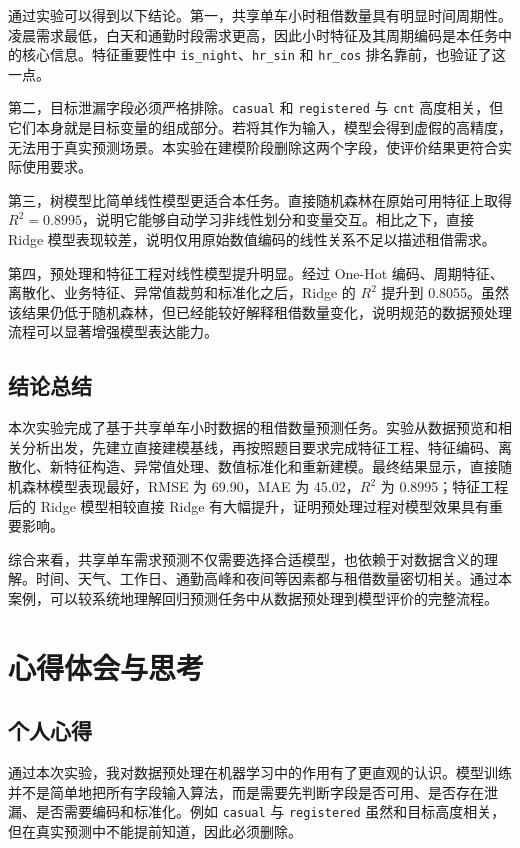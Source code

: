 \documentclass[UTF8,a4paper,12pt]{ctexart}
\begin{document}
通过实验可以得到以下结论。第一，共享单车小时租借数量具有明显时间周期性。凌晨需求最低，白天和通勤时段需求更高，因此小时特征及其周期编码是本任务中的核心信息。特征重要性中 \texttt{is\_night}、\texttt{hr\_sin} 和 \texttt{hr\_cos} 排名靠前，也验证了这一点。

第二，目标泄漏字段必须严格排除。\texttt{casual} 和 \texttt{registered} 与 \texttt{cnt} 高度相关，但它们本身就是目标变量的组成部分。若将其作为输入，模型会得到虚假的高精度，无法用于真实预测场景。本实验在建模阶段删除这两个字段，使评价结果更符合实际使用要求。

第三，树模型比简单线性模型更适合本任务。直接随机森林在原始可用特征上取得 $R^2=0.8995$，说明它能够自动学习非线性划分和变量交互。相比之下，直接 Ridge 模型表现较差，说明仅用原始数值编码的线性关系不足以描述租借需求。

第四，预处理和特征工程对线性模型提升明显。经过 One-Hot 编码、周期特征、离散化、业务特征、异常值裁剪和标准化之后，Ridge 的 $R^2$ 提升到 0.8055。虽然该结果仍低于随机森林，但已经能较好解释租借数量变化，说明规范的数据预处理流程可以显著增强模型表达能力。

\subsection{结论总结}

本次实验完成了基于共享单车小时数据的租借数量预测任务。实验从数据预览和相关分析出发，先建立直接建模基线，再按照题目要求完成特征工程、特征编码、离散化、新特征构造、异常值处理、数值标准化和重新建模。最终结果显示，直接随机森林模型表现最好，RMSE 为 69.90，MAE 为 45.02，$R^2$ 为 0.8995；特征工程后的 Ridge 模型相较直接 Ridge 有大幅提升，证明预处理过程对模型效果具有重要影响。

综合来看，共享单车需求预测不仅需要选择合适模型，也依赖于对数据含义的理解。时间、天气、工作日、通勤高峰和夜间等因素都与租借数量密切相关。通过本案例，可以较系统地理解回归预测任务中从数据预处理到模型评价的完整流程。

\section{心得体会与思考}

\subsection{个人心得}

通过本次实验，我对数据预处理在机器学习中的作用有了更直观的认识。模型训练并不是简单地把所有字段输入算法，而是需要先判断字段是否可用、是否存在泄漏、是否需要编码和标准化。例如 \texttt{casual} 与 \texttt{registered} 虽然和目标高度相关，但在真实预测中不能提前知道，因此必须删除。
\end{document}
